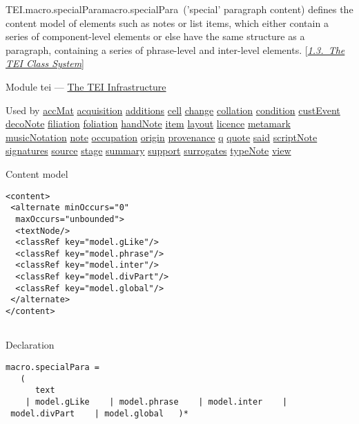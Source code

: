 \begin{reflist}
\item[]\begin{specHead}{TEI.macro.specialPara}{macro.specialPara} ('special' paragraph content) defines the content model of elements such as notes or list items, which either contain a series of component-level elements or else have the same structure as a paragraph, containing a series of phrase-level and inter-level elements. [\textit{\hyperref[STEC]{1.3.\ The TEI Class System}}]\end{specHead} 
    \item[{Module}]
  tei — \hyperref[ST]{The TEI Infrastructure}
    \item[{Used by}]
  \hyperref[TEI.accMat]{accMat} \hyperref[TEI.acquisition]{acquisition} \hyperref[TEI.additions]{additions} \hyperref[TEI.cell]{cell} \hyperref[TEI.change]{change} \hyperref[TEI.collation]{collation} \hyperref[TEI.condition]{condition} \hyperref[TEI.custEvent]{custEvent} \hyperref[TEI.decoNote]{decoNote} \hyperref[TEI.filiation]{filiation} \hyperref[TEI.foliation]{foliation} \hyperref[TEI.handNote]{handNote} \hyperref[TEI.item]{item} \hyperref[TEI.layout]{layout} \hyperref[TEI.licence]{licence} \hyperref[TEI.metamark]{metamark} \hyperref[TEI.musicNotation]{musicNotation} \hyperref[TEI.note]{note} \hyperref[TEI.occupation]{occupation} \hyperref[TEI.origin]{origin} \hyperref[TEI.provenance]{provenance} \hyperref[TEI.q]{q} \hyperref[TEI.quote]{quote} \hyperref[TEI.said]{said} \hyperref[TEI.scriptNote]{scriptNote} \hyperref[TEI.signatures]{signatures} \hyperref[TEI.source]{source} \hyperref[TEI.stage]{stage} \hyperref[TEI.summary]{summary} \hyperref[TEI.support]{support} \hyperref[TEI.surrogates]{surrogates} \hyperref[TEI.typeNote]{typeNote} \hyperref[TEI.view]{view}
    \item[{Content model}]
  \mbox{}\hfill\\[-10pt]\begin{Verbatim}[fontsize=\small]
<content>
 <alternate minOccurs="0"
  maxOccurs="unbounded">
  <textNode/>
  <classRef key="model.gLike"/>
  <classRef key="model.phrase"/>
  <classRef key="model.inter"/>
  <classRef key="model.divPart"/>
  <classRef key="model.global"/>
 </alternate>
</content>
    
\end{Verbatim}

    \item[{Declaration}]
  \mbox{}\hfill\\[-10pt]\begin{Verbatim}[fontsize=\small]
macro.specialPara =
   (
      text
    | model.gLike    | model.phrase    | model.inter    | model.divPart    | model.global   )*
\end{Verbatim}

\end{reflist}  
